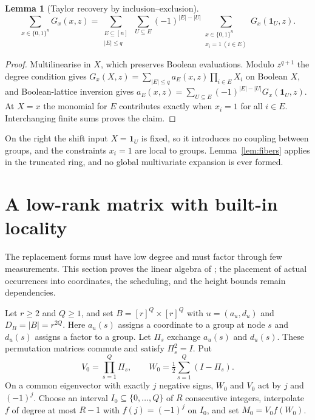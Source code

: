 \documentclass[11pt,reqno]{amsart}
\numberwithin{equation}{section}
\theoremstyle{plain}
\newtheorem{lemma}[theorem]{Lemma}
\theoremstyle{definition}
\theoremstyle{remark}
\newcommand{\ind}{\mathbf 1}
\begin{document}
\begin{lemma}[Taylor recovery by inclusion--exclusion]\label{lem:taylor}
\begin{equation}\label{eq:taylor}
 \sum_{x\in\{0,1\}^n}G_x(x,z)=
 \sum_{\substack{E\subseteq[n]\\|E|\le q}}\ \sum_{U\subseteq E}(-1)^{|E|-|U|}
 \sum_{\substack{x\in\{0,1\}^n\\x_i=1\ (i\in E)}}G_x(\ind_U,z).
\end{equation}
\end{lemma}
\begin{proof}
Multilinearise in $X$, which preserves Boolean evaluations. Modulo $z^{q+1}$
the degree condition gives $G_x(X,z)=\sum_{|E|\le q}a_E(x,z)\prod_{i\in E}X_i$
on Boolean $X$, and Boolean-lattice inversion gives
$a_E(x,z)=\sum_{U\subseteq E}(-1)^{|E|-|U|}G_x(\ind_U,z)$. At $X=x$ the
monomial for $E$ contributes exactly when $x_i=1$ for all $i\in E$.
Interchanging finite sums proves the claim.
\end{proof}
On the right the shift input $X=\ind_U$ is fixed, so it introduces no coupling
between groups, and the constraints $x_i=1$ are local to groups.
Lemma~\ref{lem:fibers} applies in the truncated ring, and no global
multivariate expansion is ever formed.

\section{A low-rank matrix with built-in locality}\label{sec:matrix}
The replacement forms must have low degree and must factor through few
measurements. This section proves the linear algebra of
\cite[Section~4]{OpenAIPaper}; the placement of actual occurrences into
coordinates, the scheduling, and the height bounds remain dependencies.

Let $r\ge2$ and $Q\ge1$, and set $B=[r]^Q\times[r]^Q$ with $u=(a_u,d_u)$ and
$D_B=|B|=r^{2Q}$. Here $a_u(s)$ assigns a coordinate to a group at node $s$
and $d_u(s)$ assigns a factor to a group. Let $\Pi_s$ exchange $a_u(s)$ and
$d_u(s)$. These permutation matrices commute and satisfy $\Pi_s^2=I$. Put
\[
 V_0=\prod_{s=1}^Q\Pi_s,\qquad W_0=\tfrac12\sum_{s=1}^Q(I-\Pi_s).
\]
On a common eigenvector with exactly $j$ negative signs, $W_0$ and $V_0$ act
by $j$ and $(-1)^j$. Choose an interval $I_0\subseteq\{0,\dots,Q\}$ of $R$
consecutive integers, interpolate $f$ of degree at most $R-1$ with
$f(j)=(-1)^j$ on $I_0$, and set $M_0=V_0f(W_0)$.
\end{document}
